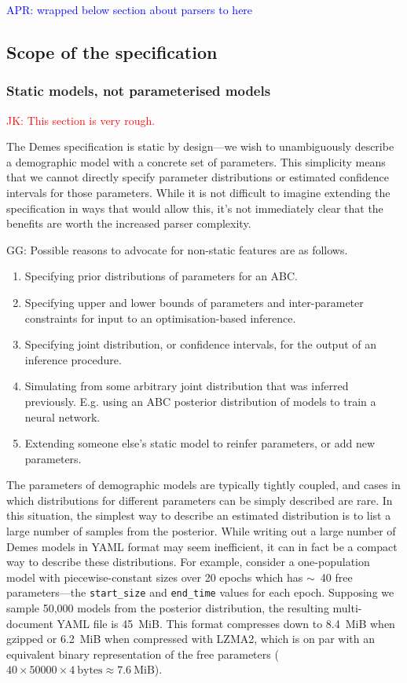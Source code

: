 \documentclass[11pt]{article}
\newcommand{\aprcomment}[1]{{\textcolor{blue}{APR: #1}}}
\newcommand{\jkcomment}[1]{{\textcolor{red}{JK: #1}}}
\newcommand{\ggcomment}[1]{{\textcolor{yellow!60!red}{GG: #1}}}
\begin{document}
\aprcomment{wrapped below section about parsers to here}

\subsection*{Scope of the specification}
\subsubsection*{Static models, not parameterised models}
\jkcomment{This section is very rough.}


The Demes specification is static by design---we wish to
unambiguously describe a demographic model with a concrete set
of parameters. This simplicity means that we cannot directly
specify parameter distributions or estimated confidence intervals
for those parameters. While it is not difficult to imagine extending
the specification in ways that would allow this, it's not immediately
clear that the benefits are worth the increased parser complexity.

\ggcomment{
Possible reasons to advocate for non-static features are as follows.
\begin{enumerate}
\item Specifying prior distributions of parameters for an ABC.
\item Specifying upper and lower bounds of parameters and inter-parameter
      constraints for input to an optimisation-based inference.
\item Specifying joint distribution, or confidence intervals, for the output of
      an inference procedure.
\item Simulating from some arbitrary joint distribution that was inferred
      previously. E.g. using an ABC posterior distribution of models to
      train a neural network.
\item Extending someone else's static model to reinfer parameters,
      or add new parameters.
\end{enumerate}
}

The parameters of
demographic models are typically tightly coupled, and cases in which
distributions for different parameters can be simply described are rare.
In this situation, the simplest way to describe an estimated
distribution is to list a large number of samples from
the posterior. While writing out a large number of Demes models in
YAML format may seem inefficient, it can in fact be a compact
way to describe these distributions.
For example, consider a one-population model with piecewise-constant sizes over
20 epochs which has $\sim$~40 free parameters---the \texttt{start\_size} and
\texttt{end\_time} values for each epoch. Supposing we sample 50,000 models
from the posterior distribution, the resulting multi-document YAML file is
45~MiB.
This format compresses down to 8.4~MiB when gzipped or 6.2~MiB
when compressed with LZMA2, which is on par with an equivalent binary
representation of the free parameters
($40\times50000\times4~\text{bytes} \approx 7.6~\text{MiB}$).
\end{document}
